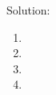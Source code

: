 \documentclass[]{article}
\begin{document}
\bigskip
Solution:
\begin{enumerate}[label=(\alph*)]
    \item %
          
    \item %
        
    \item %
    
    \item %
    
\end{enumerate}


\newpage
\end{document}
